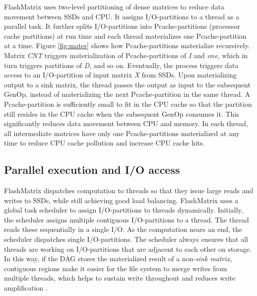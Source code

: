 FlashMatrix uses two-level partitioning of dense matrices
to reduce data movement between SSDs and CPU. It assigns I/O-partitions
to a thread as a parallel task.
It further splits I/O-partitions into Pcache-partitions (processor cache
partitions) at run time and each thread materializes one Pcache-partition
at a time. 
Figure \ref{fig:mater} shows how Pcache-partitions
materialize recursively. Matrix \textit{CNT} triggers materialization of
Pcache-partitions of \textit{I} and \textit{one}, which in turn triggers 
partitions of \textit{D}, and so on. Eventually, the process triggers data access
to an I/O-partition of input matrix \textit{X} from SSDs. Upon materializing
output to a sink matrix, the thread passes the output as input to the subsequent
GenOp, instead of materializing the next Pcache-partition in the same thread.
A Pcache-partition is sufficiently small to fit in the CPU cache so that
the partition still resides in the CPU cache when the subsequent GenOp consumes
it. This significantly reduces data movement between CPU and memory. In each
thread, all intermediate matrices have only one Pcache-partitions materialized
at any time to reduce CPU cache pollution and increase CPU cache hits.



\vspace{-8pt}
\subsection{Parallel execution and I/O access}
\vspace{-4pt}
FlashMatrix dispatches computation to threads so that they
issue large reads and writes to SSDs, while still achieving good load balancing.
%
FlashMatrix uses a global task scheduler to assign 
I/O-partitions to threads dynamically. Initially,
the scheduler assigns multiple contiguous I/O-partitions to a thread.
The thread reads these sequentially in a single I/O.
As the computation nears an end, the scheduler dispatches single I/O-partitions. 
The scheduler always ensures that all threads are working on I/O-partitions that are adjacent to
each other on storage.
In this way, if the DAG stores the materialized result of a non-\textit{sink matrix}, 
contiguous regions make it easier for the file system to merge
writes from multiple threads, which helps to sustain write throughout and reduces
write amplification \cite{}.

